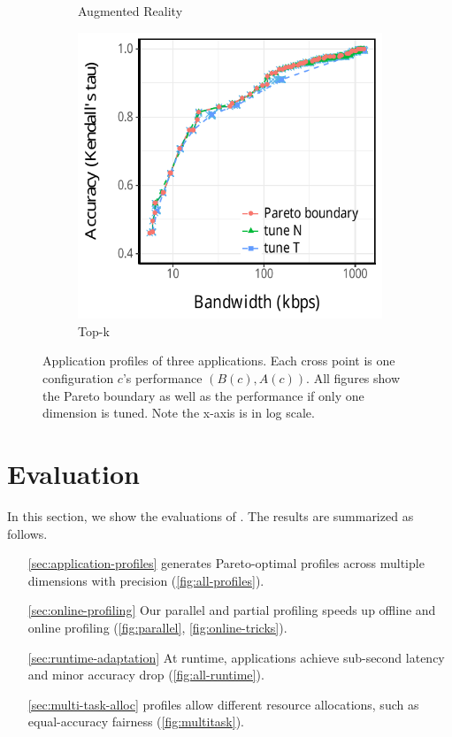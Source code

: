 \begin{figure}[htb]
\begin{subfigure}[t]{0.33\textwidth}
    \caption{Augmented Reality}
    \label{fig:ar-profile}
  \end{subfigure}
  \hfill
  \begin{subfigure}[t]{0.33\textwidth}
    \centering
    \includegraphics[width=\textwidth]{figures/profile-topk.pdf}
    \caption{Top-k}
    \label{fig:tk-profile}
  \end{subfigure}
  \caption{Application profiles of three applications. Each cross point is one
    configuration $c$'s performance $(B(c), A(c))$. All figures show the Pareto
    boundary as well as the performance if only one dimension is tuned. Note the
    x-axis is in log scale.}
  \label{fig:all-profiles}
\end{figure}

\newpage

\section{Evaluation}
\label{sec:evaluation}

In this section, we show the evaluations of \sysname{}. The results are
summarized as follows.

\begin{itemize}
\item[\autoref{sec:application-profiles}] \sysname{} generates Pareto-optimal
  profiles across multiple dimensions with precision
  (\autoref{fig:all-profiles}).
\item[\autoref{sec:online-profiling}] Our parallel and partial profiling speeds
  up offline and online profiling (\autoref{fig:parallel},
  \autoref{fig:online-tricks}).
\item[\autoref{sec:runtime-adaptation}] At runtime, \sysname{} applications
  achieve sub-second latency and minor accuracy drop
  (\autoref{fig:all-runtime}).
\item[\autoref{sec:multi-task-alloc}] \sysname{} profiles allow different
  resource allocations, such as equal-accuracy fairness
  (\autoref{fig:multitask}).
\end{itemize}


